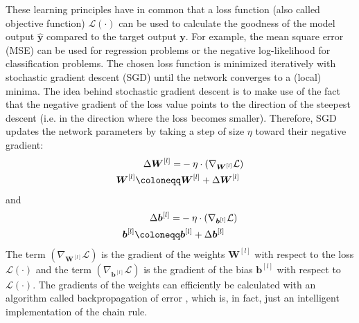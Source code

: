 These learning principles have in common that a loss function (also called objective function) $\mathcal{L}(\cdot)$ can be used to calculate the goodness of the model output $\boldsymbol{\hat{y}}$ compared to the target output ${\boldsymbol{y}}$. For example, the mean square error (MSE) can be used for regression problems or the negative log-likelihood for classification problems.
The chosen loss function is minimized iteratively with stochastic gradient descent (SGD) until the network converges to a (local) minima.
The idea behind stochastic gradient descent is to make use of the fact that the negative gradient of the loss value points to the direction of the steepest descent (i.e. in the direction where the loss becomes smaller).
Therefore, SGD updates the network parameters by taking a step of size $\eta$ toward their negative gradient:
%
\begin{align}\eqlbl{sgd}
	\begin{aligned}
		\Delta \boldsymbol{W}^{[l]} = & -\eta \cdot \left( \nabla_{\boldsymbol{W}^{[l]}} \mathcal{L} \right)\\
		\boldsymbol{W}^{[l]} \coloneqq & \boldsymbol{W}^{[l]} + \Delta \boldsymbol{W}^{[l]}
	\end{aligned}
\end{align}
%
and
%	
\begin{align}\eqlbl{sgd2}	
	\begin{aligned}
		\Delta \boldsymbol{b}^{[l]} = & -\eta \cdot \left( \nabla_{\boldsymbol{b}^{[l]}} \mathcal{L} \right)\\
		\boldsymbol{b}^{[l]} \coloneqq & \boldsymbol{b}^{[l]} + \Delta \boldsymbol{b}^{[l]}
	\end{aligned}
\end{align}
%
The term $\left( \nabla_{\boldsymbol{W}^{[l]}} \mathcal{L} \right)$ is the gradient of the weights \(\boldsymbol{W}^{[l]}\)  with respect to the loss $\mathcal{L}(\cdot)$ and the term $\left( \nabla_{\boldsymbol{b}^{[l]}} \mathcal{L} \right)$ is the gradient of the bias \(\boldsymbol{b}^{[l]}\)  with respect to $\mathcal{L}(\cdot)$.
The gradients of the weights can efficiently be calculated with an algorithm called backpropagation of error , which is, in fact, just an intelligent implementation of the chain rule.

